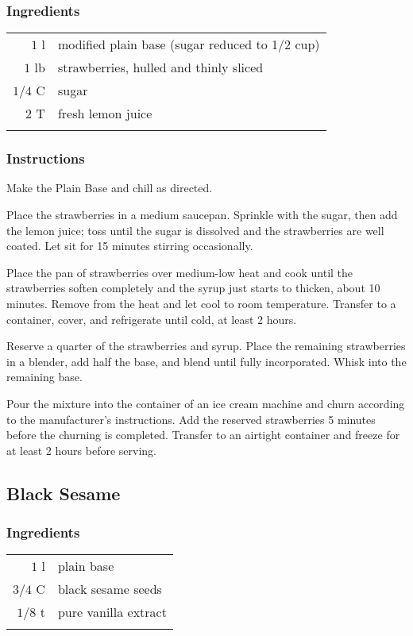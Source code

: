 \documentclass[12pt,landscape,twoside,twocolumn, openright, titlepage, draft]{book}
\begin{document}
\subsubsection{Ingredients}
\begin{tabular}{r p{1.5in}}
$1$   l  & modified plain base (sugar reduced to 1/2 cup) \\
$1$   lb & strawberries, hulled and thinly sliced \\ 
$1/4$ C  & sugar    \\
$2$   T  & fresh lemon juice  \\ \\
\end{tabular}
\subsubsection{Instructions}
Make the Plain Base and chill as directed.

Place the strawberries in a medium saucepan. Sprinkle with the sugar, then add the lemon juice; toss until the sugar is dissolved and the strawberries are well coated. Let sit for 15 minutes stirring occasionally.

Place the pan of strawberries over medium-low heat and cook until the strawberries soften completely and the syrup just starts to thicken, about 10 minutes. Remove from the heat and let cool to room temperature. Transfer to a container, cover, and refrigerate until cold, at least 2 hours.

Reserve a quarter of the strawberries and syrup. Place the remaining strawberries in a blender, add half the base, and blend until fully incorporated. Whisk into the remaining base.

Pour the mixture into the container of an ice cream machine and churn according to the manufacturer's instructions. Add the reserved strawberries 5 minutes before the churning is completed. Transfer to an airtight container and freeze for at least 2 hours before serving.

\subsection{Black Sesame}
\subsubsection{Ingredients}
\begin{tabular}{r p{1.5in}}
$1$   l & plain base            \\ 
$3/4$ C & black sesame seeds    \\ 
$1/8$ t & pure vanilla extract  \\ \\
\end{tabular}
\end{document}

